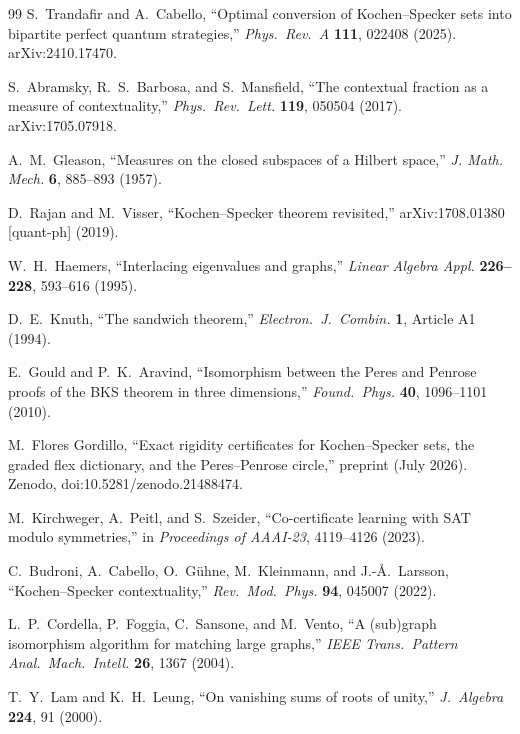 \documentclass[12pt,a4paper]{article}
\begin{document}
\begin{thebibliography}{99}
S.~Trandafir and A.~Cabello,
``Optimal conversion of Kochen--Specker sets into bipartite perfect quantum strategies,''
\textit{Phys.\ Rev.\ A} \textbf{111}, 022408 (2025).
arXiv:2410.17470.

S.~Abramsky, R.~S.~Barbosa, and S.~Mansfield,
``The contextual fraction as a measure of contextuality,''
\textit{Phys.\ Rev.\ Lett.} \textbf{119}, 050504 (2017).
arXiv:1705.07918.

A.~M.~Gleason,
``Measures on the closed subspaces of a Hilbert space,''
\textit{J. Math. Mech.} \textbf{6}, 885--893 (1957).

D.~Rajan and M.~Visser,
``Kochen--Specker theorem revisited,''
arXiv:1708.01380 [quant-ph] (2019).

W.~H.~Haemers,
``Interlacing eigenvalues and graphs,''
\textit{Linear Algebra Appl.} \textbf{226--228}, 593--616 (1995).

D.~E.~Knuth,
``The sandwich theorem,''
\textit{Electron.\ J.\ Combin.} \textbf{1}, Article A1 (1994).

E.~Gould and P.~K.~Aravind,
``Isomorphism between the Peres and Penrose proofs of the BKS theorem in three dimensions,''
\textit{Found.\ Phys.} \textbf{40}, 1096--1101 (2010).

M.~Flores Gordillo,
``Exact rigidity certificates for Kochen--Specker sets, the graded flex dictionary, and the Peres--Penrose circle,''
preprint (July 2026).
Zenodo, doi:10.5281/zenodo.21488474.

M.~Kirchweger, A.~Peitl, and S.~Szeider,
``Co-certificate learning with SAT modulo symmetries,''
in \textit{Proceedings of AAAI-23}, 4119--4126 (2023).

C.~Budroni, A.~Cabello, O.~G\"uhne, M.~Kleinmann, and J.-\AA.~Larsson,
``Kochen--Specker contextuality,''
\textit{Rev.\ Mod.\ Phys.} \textbf{94}, 045007 (2022).

L.~P.~Cordella, P.~Foggia, C.~Sansone, and M.~Vento,
``A (sub)graph isomorphism algorithm for matching large graphs,''
\textit{IEEE Trans.\ Pattern Anal.\ Mach.\ Intell.} \textbf{26}, 1367 (2004).

T.~Y.~Lam and K.~H.~Leung,
``On vanishing sums of roots of unity,''
\textit{J.\ Algebra} \textbf{224}, 91 (2000).


\end{thebibliography}
\end{document}
